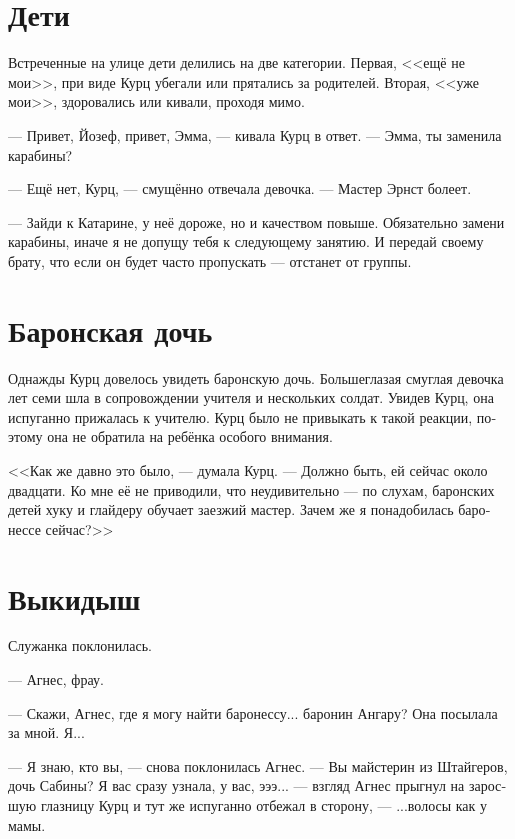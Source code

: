 \documentclass[a4paper,10pt,fleqn]{book}\usepackage{polyglossia}\setdefaultlanguage[babelshorthands=true]{russian}\setotherlanguage{english}\defaultfontfeatures{Ligatures=TeX,Mapping=tex-text}\usepackage{xcolor}\newcommand{\ml}[3]{#2}
\begin{document}
\section{Дети}

Встреченные на улице дети делились на две категории.
Первая, <<ещё не мои>>, при виде Курц убегали или прятались за родителей.
Вторая, <<уже мои>>, здоровались или кивали, проходя мимо.

--- Привет, Йозеф, привет, Эмма, --- кивала Курц в ответ.
--- Эмма, ты заменила карабины?

--- Ещё нет, Курц, --- смущённо отвечала девочка.
--- Мастер Эрнст болеет.

--- Зайди к Катарине, у неё дороже, но и качеством повыше.
Обязательно замени карабины, иначе я не допущу тебя к следующему занятию.
И передай своему брату, что если он будет часто пропускать --- отстанет от группы.

\section{Баронская дочь}

Однажды Курц довелось увидеть баронскую дочь.
Большеглазая смуглая девочка лет семи шла в сопровождении учителя и нескольких солдат.
Увидев Курц, она испуганно прижалась к учителю.
Курц было не привыкать к такой реакции, поэтому она не обратила на ребёнка особого внимания.

<<Как же давно это было, --- думала Курц.
--- Должно быть, ей сейчас около двадцати.
Ко мне её не приводили, что неудивительно --- по слухам, баронских детей хуку и глайдеру обучает заезжий мастер.
Зачем же я понадобилась баронессе сейчас?>>

\section{Выкидыш}

Служанка поклонилась.

--- Агнес, фрау.

--- Скажи, Агнес, где я могу найти баронессу... баронин Ангару?
Она посылала за мной.
Я...

--- Я знаю, кто вы, --- снова поклонилась Агнес.
\ml{$0$}
{--- Вы майстерин из Штайгеров, дочь Сабины?}
{``You're the \textit{meisterin}, Steiger kin, Sabina's daughter?}
Я вас сразу узнала, у вас, эээ... --- взгляд Агнес прыгнул на заросшую глазницу Курц и тут же испуганно отбежал в сторону, --- ...волосы как у мамы.
\end{document}
